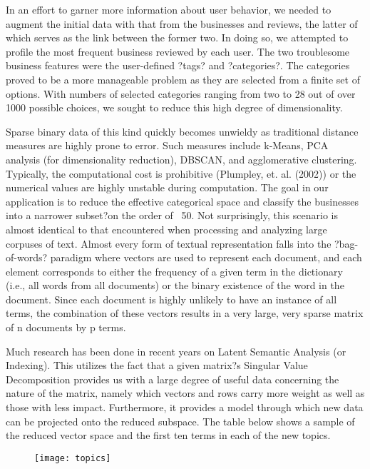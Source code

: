 \quad In an effort to garner more information about user behavior, we needed to augment the initial data with that from the businesses and reviews, the latter of which serves as the link between the former two. In doing so, we attempted to profile the most frequent business reviewed by each user. The two troublesome business features were the user-defined ?tags? and ?categories?. The categories proved to be a more manageable problem as they are selected from a finite set of options. With numbers of selected categories ranging from two to 28 out of over 1000 possible choices, we sought to reduce this high degree of dimensionality.

\quad Sparse binary data of this kind quickly becomes unwieldy as traditional distance measures are highly prone to error. Such measures include k-Means, PCA analysis (for dimensionality reduction), DBSCAN, and agglomerative clustering. Typically, the computational cost is prohibitive (Plumpley, et. al. (2002)) or the numerical values are highly unstable during computation. The goal in our application is to reduce the effective categorical space and classify the businesses into a narrower subset?on the order of ~50. Not surprisingly, this scenario is almost identical to that encountered when processing and analyzing large corpuses of text. Almost every form of textual representation falls into the ?bag-of-words? paradigm where vectors are used to represent each document, and each element corresponds to either the frequency of a given term in the dictionary (i.e., all words from all documents) or the binary existence of the word in the document. Since each document is highly unlikely to have an instance of all terms, the combination of these vectors results in a very large, very sparse matrix of n documents by p terms.

\quad Much research has been done in recent years on Latent Semantic Analysis (or Indexing). This utilizes the fact that a given matrix?s Singular Value Decomposition provides us with a large degree of useful data concerning the nature of the matrix, namely which vectors and rows carry more weight as well as those with less impact. Furthermore, it provides a model through which new data can be projected onto the reduced subspace. The table below shows a sample of the reduced vector space and the first ten terms in each of the new topics.

\begin{figure}[!h]
\texttt{[image: topics]}
\end{figure}

